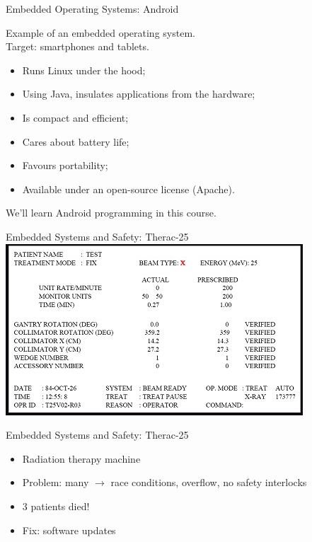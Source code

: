 \documentclass{beamer}
\begin{document}
\begin{frame}{Embedded Operating Systems: Android}

Example of an \alert{embedded operating system}.\\[1em]

Target: smartphones and tablets.
\begin{itemize}
\item Runs Linux under the hood;
\item Using Java, insulates applications from the hardware;
\item Is compact and efficient;
\item Cares about battery life;
\item Favours portability;
\item Available under an open-source license (Apache).
\end{itemize}

We'll learn Android programming in this course.

\end{frame}

\begin{frame}{Embedded Systems and Safety: Therac-25}
\centering
\includegraphics[width=0.8\linewidth]{img/Xraybad.jpg}
\end{frame} 

\begin{frame}{Embedded Systems and Safety: Therac-25}
  \begin{itemize}
  \item Radiation therapy machine
  \item Problem: \alert{many} $\rightarrow$ race conditions, overflow,
    no safety interlocks
  \item 3 patients died!
  \item Fix: software updates
  \end{itemize}



\end{frame}
\end{document}
